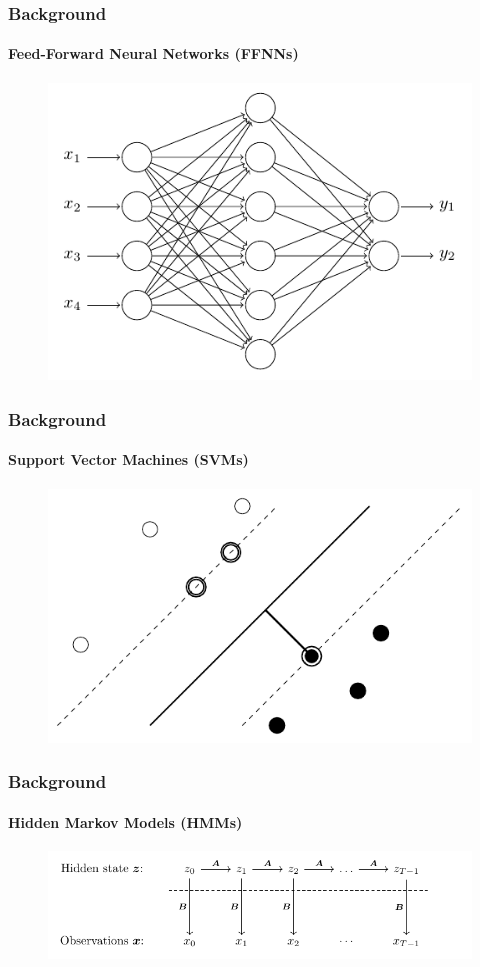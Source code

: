 \documentclass[xcolor={svgnames,table},10pt,fleqn]{beamer}
\begin{document}
\begin{frame}
    \frametitle{Background}
    \framesubtitle{Feed-Forward Neural Networks (FFNNs)}
    \begin{figure}
        \includegraphics{imgs/neural_network.pdf}
        \caption{}
    \end{figure}
\end{frame}

\begin{frame}
    \frametitle{Background}
    \framesubtitle{Support Vector Machines (SVMs)}
    \begin{figure}
        \includegraphics{imgs/support_vector_machines.pdf}
    \end{figure}
\end{frame}

\begin{frame}
    \frametitle{Background}
    \framesubtitle{Hidden Markov Models (HMMs)}
    \begin{figure}
        \includegraphics[width=\textwidth]{imgs/hidden_markov_model.pdf}
    \end{figure}
\end{frame}
\end{document}
